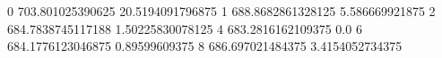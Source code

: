 0 703.801025390625 20.5194091796875
1 688.8682861328125 5.586669921875
2 684.7838745117188 1.50225830078125
4 683.2816162109375 0.0
6 684.1776123046875 0.89599609375
8 686.697021484375 3.4154052734375
